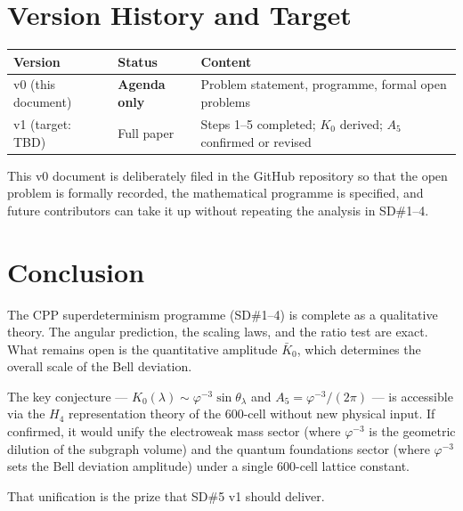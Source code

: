 \documentclass[11pt,a4paper]{article}
\newcommand{\phig}{\varphi}
\begin{document}
\section{Version History and Target}

\begin{center}
\begin{tabular}{@{}lll@{}}
\toprule
Version & Status & Content \\
\midrule
v0 (this document) & \textbf{Agenda only} & Problem statement,
  programme, formal open problems \\
v1 (target: TBD) & Full paper & Steps 1--5 completed;
  $K_0$ derived; $A_5$ confirmed or revised \\
\bottomrule
\end{tabular}
\end{center}

This v0 document is deliberately filed in the GitHub repository
so that the open problem is formally recorded, the mathematical
programme is specified, and future contributors can take it up
without repeating the analysis in SD\#1--4.

\section{Conclusion}

The CPP superdeterminism programme (SD\#1--4) is complete as a
qualitative theory.  The angular prediction, the scaling laws,
and the ratio test are exact.  What remains open is the
quantitative amplitude $\bar K_0$, which determines the overall
scale of the Bell deviation.

The key conjecture — $K_0(\lambda) \sim \phig^{-3}\sin\theta_\lambda$
and $A_5 = \phig^{-3}/(2\pi)$ — is accessible via the $H_4$
representation theory of the 600-cell without new physical input.
If confirmed, it would unify the electroweak mass sector (where
$\phig^{-3}$ is the geometric dilution of the subgraph volume) and
the quantum foundations sector (where $\phig^{-3}$ sets the Bell
deviation amplitude) under a single 600-cell lattice constant.

That unification is the prize that SD\#5 v1 should deliver.
\end{document}

